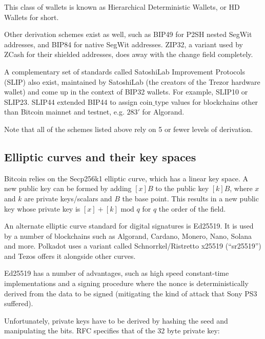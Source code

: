 \documentclass[12pt, a4paper, twocolumn]{article}
\begin{document}
This class of wallets is known as Hierarchical Deterministic Wallets, or HD Wallets for short.

Other derivation schemes exist as well, such as BIP49\cite{BIP49} for P2SH nested SegWit addresses, and BIP84\cite{BIP84} for native SegWit addresses. ZIP32\cite{ZIP32}, a variant used by ZCash for their shielded addresses, does away with the change field completely.

A complementary set of standards called SatoshiLab Improvement Protocols (SLIP) also exist, maintained by SatoshiLab (the creators of the Trezor hardware wallet) and come up in the context of BIP32 wallets. For example, SLIP10\cite{SLIP10} or SLIP23\cite{SLIP23}. SLIP44\cite{BIP44} extended BIP44 to assign $\text{coin\_type}$ values for blockchains other than Bitcoin mainnet and testnet, e.g. $\text{283}'$ for Algorand.

Note that all of the schemes listed above rely on 5 or fewer levels of derivation.

\subsection{Elliptic curves and their key spaces}
\label{subsec:elliptic_curves_and_their_key_spaces}

Bitcoin relies on the Secp256k1\cite{Secp256k1} elliptic curve, which has a linear key space. A new public key can be formed by adding $[x]B$ to the public key $[k]B$, where $x$ and $k$ are private keys/scalars and $B$ the base point. This results in a new public key whose private key is $[x] + [k] \text{ mod } q$ for $q$ the order of the field.

An alternate elliptic curve standard for digital signatures is Ed25519\cite{Ed25519}. It is used by a number of blockchains such as Algorand\cite{AlgorandEd25519}, Cardano\cite{CardanoEd25519}, Monero\cite{MoneroEd25519}, Nano\cite{NanoEd25519}, Solana\cite{SolanaEd25519} and more. Polkadot\cite{PolkadotEd25519} uses a variant called Schnorrkel/Ristretto x25519 (``sr25519'') and Tezos\cite{TezosEd25519} offers it alongside other curves.

Ed25519 has a number of advantages, such as high speed constant-time implementations and a signing procedure where the nonce is deterministically derived from the data to be signed (mitigating the kind of attack that Sony PS3 suffered\cite{Ed25519}).

Unfortunately, private keys have to be derived by hashing the seed and manipulating the bits. RFC\cite{RFC8032} specifies that of the 32 byte private key:
\end{document}
